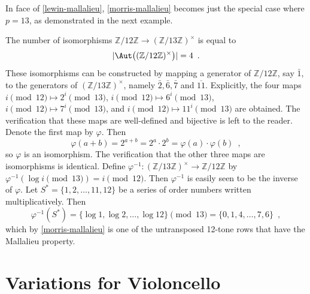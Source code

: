 In face of \ref{lewin-mallalieu}, \ref{morris-mallalieu} becomes just the special case where $p = 13$, as demonstrated in the next example.

\begin{example}
	\cite[8]{Lewin1976a}
	\cite[9]{Babbitt1976}
	The number of isomorphisms $\mathbb{Z} / 12 \mathbb{Z} \to (\mathbb{Z} / 13 \mathbb{Z})^\times$ is equal to
	\begin{equation}
		|\Aut\big((\mathbb{Z} / 12 \mathbb{Z})^\times\big)| = 4 \enspace.
	\end{equation}
	These isomorphisms can be constructed by mapping a generator of $\mathbb{Z} / 12 \mathbb{Z}$, say $\bar{1}$, to the generators of $(\mathbb{Z} / 13 \mathbb{Z})^\times$, namely $\bar{2}, \bar{6}, \bar{7}$ and $\overline{11}$. Explicitly, the four maps $i \pmod{12} \mapsto 2^i \pmod{13}$, $i \pmod{12} \mapsto 6^i \pmod{13}$, $i \pmod{12} \mapsto 7^i \pmod{13}$, and $i \pmod{12} \mapsto 11^i \pmod{13}$ are obtained. The verification that these maps are well-defined and bijective is left to the reader. Denote the first map by $\varphi$. Then
	\begin{equation}
		\varphi(a + b) = 2^{a + b} = 2^a \cdot 2^b = \varphi(a) \cdot \varphi(b) \enspace,
	\end{equation}
	so $\varphi$ is an isomorphism. The verification that the other three maps are isomorphisms is identical. Define $\varphi^{-1} : (\mathbb{Z} / 13 \mathbb{Z})^\times \to \mathbb{Z} / 12 \mathbb{Z}$ by $\varphi^{-1}(\log i \pmod{13}) = i \pmod{12}$. Then $\varphi^{-1}$ is easily seen to be the inverse of $\varphi$. Let $S^* = \{ 1, 2, \dots, 11, 12 \}$ be a series of order numbers written multiplicatively. Then
	\begin{equation}
		\varphi^{-1}(S^*) = \{ \log 1, \log 2, \dots, \log 12 \} \pmod{13} = \{ 0, 1, 4, \dots, 7, 6 \} \enspace,
	\end{equation}
	which by \ref{morris-mallalieu} is one of the untransposed 12-tone rows that have the Mallalieu property.
\end{example}

\chapter{Variations for Violoncello}

